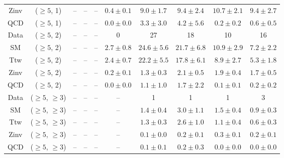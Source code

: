 \begin{table}[h!]
{\begin{tabular}{cccccccccc}
	Zinv & ($\ge5$, 1) & -- & -- & -- & $0.4\pm 0.1$ & $9.0\pm 1.7$ & $9.4\pm 2.4$ & $10.7\pm 2.1$ & $9.4\pm 2.7$ \\[0.5ex] 
	QCD & ($\ge5$, 1) & -- & -- & -- & $0.0\pm 0.0$ & $3.3\pm 3.0$ & $4.2\pm 5.6$ & $0.2\pm 0.2$ & $0.6\pm 0.5$ \\[0.5ex] 
	Data & ($\ge5$, 2) & -- & -- & -- & 0 & 27 & 18 & 10 & 16 \\[0.5ex] 
	SM & ($\ge5$, 2) & -- & -- & -- & $2.7\pm 0.8$ & $24.6\pm 5.6$ & $21.7\pm 6.8$ & $10.9\pm 2.9$ & $7.2\pm 2.2$ \\[0.5ex] 
	Ttw & ($\ge5$, 2) & -- & -- & -- & $2.4\pm 0.7$ & $22.2\pm 5.5$ & $17.8\pm 6.1$ & $8.9\pm 2.7$ & $5.3\pm 1.8$ \\[0.5ex] 
	Zinv & ($\ge5$, 2) & -- & -- & -- & $0.2\pm 0.1$ & $1.3\pm 0.3$ & $2.1\pm 0.5$ & $1.9\pm 0.4$ & $1.7\pm 0.5$ \\[0.5ex] 
	QCD & ($\ge5$, 2) & -- & -- & -- & $0.0\pm 0.0$ & $1.1\pm 1.0$ & $1.7\pm 2.2$ & $0.1\pm 0.1$ & $0.2\pm 0.2$ \\[0.5ex] 
	Data & ($\ge5$, $\ge3$) & -- & -- & -- & -- & 1 & 1 & 1 & 3 \\[0.5ex] 
	SM & ($\ge5$, $\ge3$) & -- & -- & -- & -- & $1.4\pm 0.4$ & $3.0\pm 1.1$ & $1.5\pm 0.4$ & $0.9\pm 0.3$ \\[0.5ex] 
	Ttw & ($\ge5$, $\ge3$) & -- & -- & -- & -- & $1.3\pm 0.3$ & $2.6\pm 1.0$ & $1.1\pm 0.4$ & $0.6\pm 0.3$ \\[0.5ex] 
	Zinv & ($\ge5$, $\ge3$) & -- & -- & -- & -- & $0.1\pm 0.0$ & $0.2\pm 0.1$ & $0.3\pm 0.1$ & $0.2\pm 0.1$ \\[0.5ex] 
	QCD & ($\ge5$, $\ge3$) & -- & -- & -- & -- & $0.1\pm 0.1$ & $0.2\pm 0.3$ & $0.0\pm 0.0$ & $0.0\pm 0.0$ \\[0.5ex] 
	\hline
	\hline
\end{tabular}}
\end{table}
